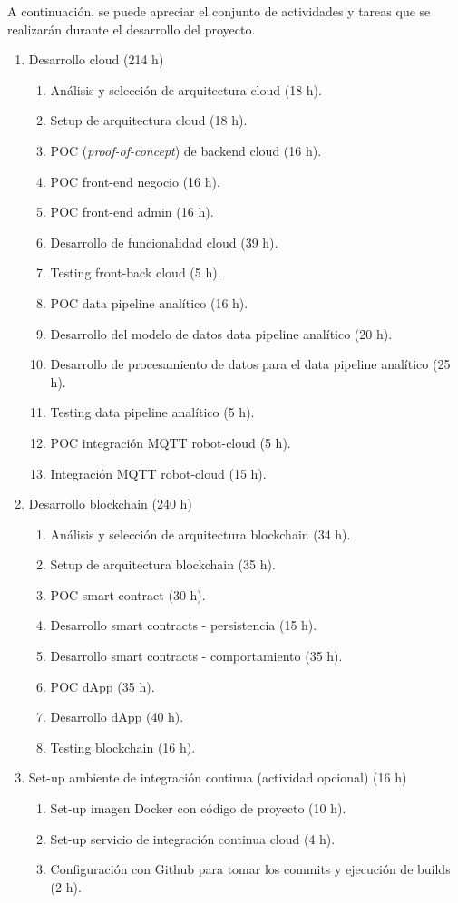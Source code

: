 \documentclass[
11pt, %
]{charter}
\begin{document}
A continuación, se puede apreciar el conjunto de actividades y tareas que se realizarán durante el desarrollo del proyecto.
\begin{enumerate}

\item Desarrollo cloud (214 h)
	\begin{enumerate}
	\item Análisis y selección de arquitectura cloud (18 h).
	\item Setup de arquitectura cloud (18 h).
	\item POC (\textit{proof-of-concept}) de backend cloud (16 h).
	\item POC front-end negocio (16 h).
	\item POC front-end admin (16 h).
	\item Desarrollo de funcionalidad cloud (39 h).
	\item Testing front-back cloud (5 h).
	\item POC data pipeline analítico (16 h).
	\item Desarrollo del modelo de datos data pipeline analítico (20 h).
	\item Desarrollo de procesamiento de datos para el data pipeline analítico (25 h).
	\item Testing data pipeline analítico (5 h).
	\item POC integración MQTT robot-cloud (5 h).
	\item Integración MQTT robot-cloud (15 h).
	\end{enumerate}

\item Desarrollo blockchain (240 h)
	\begin{enumerate}
	\item Análisis y selección de arquitectura blockchain (34 h).
	\item Setup de arquitectura blockchain (35 h).
	\item POC smart contract (30 h).
	\item Desarrollo smart contracts - persistencia (15 h).
	\item Desarrollo smart contracts - comportamiento (35 h).
	\item POC dApp (35 h).
	\item Desarrollo dApp (40 h).
	\item Testing blockchain (16 h).
	\end{enumerate}

\item Set-up ambiente de integración continua (actividad opcional) (16 h)
	\begin{enumerate}
	\item Set-up imagen Docker con código de proyecto (10 h).
	\item Set-up servicio de integración continua cloud (4 h).
	\item Configuración con Github para tomar los commits y ejecución de builds (2 h).
	\end{enumerate}



\end{enumerate}
\end{document}
